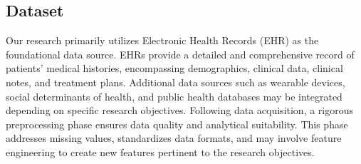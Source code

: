\documentclass[conference]{IEEEtran}
\begin{document}
    \subsection{Dataset}
    Our research primarily utilizes Electronic Health Records (EHR) as the foundational data source. EHRs provide a detailed and comprehensive record of patients' medical histories, encompassing demographics, clinical data, clinical notes, and treatment plans. Additional data sources such as wearable devices, social determinants of health, and public health databases may be integrated depending on specific research objectives. Following data acquisition, a rigorous preprocessing phase ensures data quality and analytical suitability. This phase addresses missing values, standardizes data formats, and may involve feature engineering to create new features pertinent to the research objectives.
\end{document}
